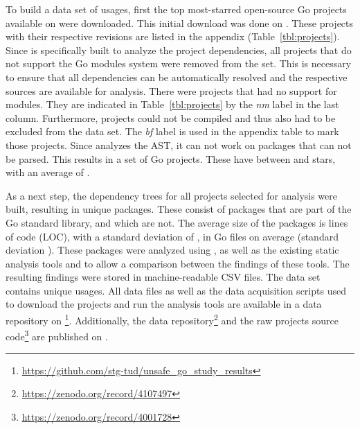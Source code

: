 To build a data set of \unsafe{} usages, first the top \projsTotal{} most-starred open-source Go projects available on
\github{} were downloaded.
This initial download was done on .
These \projsTotal{} projects with their respective revisions are listed in the appendix (Table~\ref{tbl:projects}).
Since \toolGeiger{} is specifically built to analyze the project dependencies, all projects that do not support the Go
modules system were removed from the set.
This is necessary to ensure that all dependencies can be automatically resolved and the respective sources are available
for analysis.
There were \projsWithoutModules{} projects that had no support for modules.
They are indicated in Table~\ref{tbl:projects} by the \textit{nm} label in the last column.
Furthermore, \projsNotCompiled{} projects could not be compiled and thus also had to be excluded from the data set.
The \textit{bf} label is used in the appendix table to mark those projects.
Since \toolGeiger{} analyzes the \acrshort{AST}, it can not work on packages that can not be parsed.
This results in a set of \projsAnalyzed{} Go projects.
These have between  and  stars, with an average of .

As a next step, the dependency trees for all projects selected for analysis were built, resulting in \packagesAnalyzed{}
unique packages.
These consist of  packages that are part of the Go standard library, and  which are not.
The average size of the packages is  lines of code (\acrshort{LOC}), with a standard deviation of
, in  Go files on average (standard deviation ).
These packages were analyzed using \toolGeiger{}, as well as the existing static analysis tools \toolVet{} and
\toolGosec{} to allow a comparison between the findings of these tools.
The resulting findings were stored in machine-readable \acrshort{CSV} files.
The data set contains \uniqueUnsafeFindings{} unique \unsafe{} usages.
All data files as well as the data acquisition scripts used to download the projects and run the analysis tools are
available in a data repository on \github{}\footnote{\url{https://github.com/stg-tud/unsafe_go_study_results}}.
Additionally, the data repository\footnote{\url{https://zenodo.org/record/4107497}} and the raw projects source
code\footnote{\url{https://zenodo.org/record/4001728} } are published on \zenodo{}.



